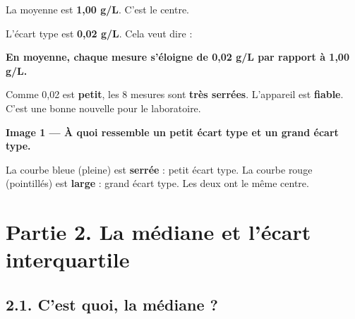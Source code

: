 \documentclass[12pt,a4paper]{article}
\begin{document}
\begin{enclair}
La moyenne est \textbf{1,00 g/L}. C'est le centre.

L'écart type est \textbf{0,02 g/L}. Cela veut dire :

\vspace{0.2cm}
\textbf{En moyenne, chaque mesure s'éloigne de 0,02 g/L par rapport à 1,00 g/L.}

\vspace{0.2cm}
Comme 0,02 est \textbf{petit}, les 8 mesures sont \textbf{très serrées}. L'appareil est \textbf{fiable}. C'est une bonne nouvelle pour le laboratoire.
\end{enclair}

\begin{graphbox}
\textbf{Image 1 — À quoi ressemble un petit écart type et un grand écart type.}

\vspace{0.3cm}
\begin{center}
\end{center}

\vspace{0.2cm}
{\small La courbe bleue (pleine) est \textbf{serrée} : petit écart type. La courbe rouge (pointillés) est \textbf{large} : grand écart type. Les deux ont le même centre.}
\end{graphbox}

\newpage

\section*{Partie 2. La médiane et l'écart interquartile}

\subsection*{2.1. C'est quoi, la médiane ?}
\end{document}
